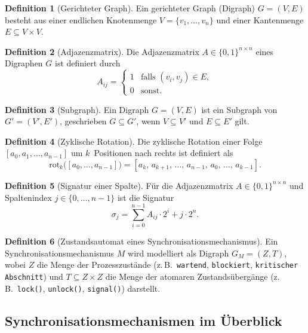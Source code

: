 ﻿\documentclass[a4paper,12pt]{article}
\theoremstyle{definition}
\newtheorem{definition}{Definition}
\begin{document}
\begin{definition}[Gerichteter Graph]
  Ein gerichteter Graph (Digraph) $G = (V, E)$ besteht aus einer endlichen
  Knotenmenge $V = \{v_1, \ldots, v_n\}$ und einer Kantenmenge
  $E \subseteq V \times V$.
\end{definition}

\begin{definition}[Adjazenzmatrix]
  Die Adjazenzmatrix $A \in \{0,1\}^{n \times n}$ eines Digraphen $G$ ist
  definiert durch
  \[
    A_{ij} =
    \begin{cases}
      1 & \text{falls } (v_i, v_j) \in E,\\
      0 & \text{sonst.}
    \end{cases}
  \]
\end{definition}

\begin{definition}[Subgraph]
  \label{def:subgraph}
  Ein Digraph $G = (V, E)$ ist ein Subgraph von $G' = (V', E')$, geschrieben
  $G \subseteq G'$, wenn $V \subseteq V'$ und $E \subseteq E'$ gilt.
\end{definition}

\begin{definition}[Zyklische Rotation]
  Die zyklische Rotation einer Folge $[a_0, a_1, \ldots, a_{n-1}]$ um
  $k$~Positionen nach rechts ist definiert als
  \[
    \mathrm{rot}_k\bigl([a_0, \ldots, a_{n-1}]\bigr)
    = [a_k,\, a_{k+1},\, \ldots,\, a_{n-1},\, a_0,\, \ldots,\, a_{k-1}].
  \]
\end{definition}

\begin{definition}[Signatur einer Spalte]
  \label{def:signatur}
  Für die Adjazenzmatrix $A \in \{0,1\}^{n \times n}$ und Spaltenindex
  $j \in \{0, \ldots, n-1\}$ ist die Signatur
  \[
    \sigma_j = \sum_{i=0}^{n-1} A_{ij} \cdot 2^{i} + j \cdot 2^{n}.
  \]
\end{definition}

\begin{definition}[Zustandsautomat eines Synchronisationsmechanismus]
  Ein Synchronisationsmechanismus $M$ wird modelliert als Digraph
  $G_M = (Z, T)$, wobei $Z$ die Menge der Prozesszustände (z.\,B.\
  \texttt{wartend}, \texttt{blockiert}, \texttt{kritischer Abschnitt}) und
  $T \subseteq Z \times Z$ die Menge der atomaren Zustandsübergänge (z.\,B.\
  \texttt{lock()}, \texttt{unlock()}, \texttt{signal()}) darstellt.
\end{definition}

\subsection{Synchronisationsmechanismen im Überblick}
\end{document}
